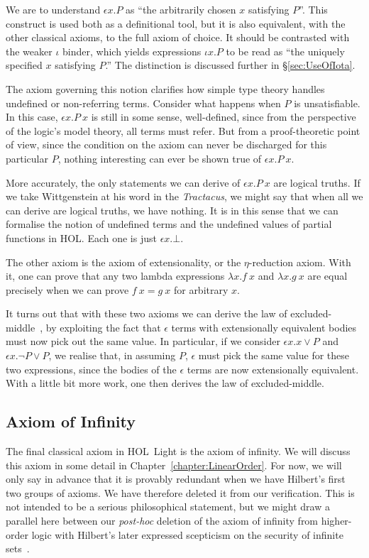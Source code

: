 We are to understand $\epsilon x. P$ as ``the arbitrarily chosen $x$ satisfying $P$''. This construct is used both as a definitional tool, but it is also equivalent, with the other classical axioms, to the full axiom of choice. It should be contrasted with the weaker $\iota$ binder, which yields expressions $\iota x. P$ to be read as ``the uniquely specified $x$ satisfying $P$.'' The distinction is discussed further in \S\ref{sec:UseOfIota}.

The axiom governing this notion clarifies how simple type theory handles undefined or non-referring terms. Consider what happens when $P$ is unsatisfiable. In this case, $\epsilon x. P\ x$ is still in some sense, well-defined, since from the perspective of the logic's model theory, all terms must refer. But from a proof-theoretic point of view, since the condition on the axiom can never be discharged for this particular $P$, nothing interesting can ever be shown true of $\epsilon x. P\ x$. 

More accurately, the only statements we can derive of $\epsilon x. P\ x$ are logical truths. If we take Wittgenstein at his word in the \emph{Tractacus}, we might say that when all we can derive are logical truths, we have nothing. It is in this sense that we can formalise the notion of undefined terms and the undefined values of partial functions in HOL. Each one is just $\epsilon x. \bot$.

The other axiom is the axiom of extensionality, or the $\eta$-reduction axiom. With it, one can prove that any two lambda expressions $\lambda x. f\ x$ and $\lambda x. g\ x$ are equal precisely when we can prove $f\ x = g\ x$ for arbitrary $x$.

It turns out that with these two axioms we can derive the law of excluded-middle~\cite{AxiomChoiceExcludedMiddle}, by exploiting the fact that $\epsilon$ terms with extensionally equivalent bodies must now pick out the same value. In particular, if we consider $\epsilon x. x \vee P$ and $\epsilon x. \neg P \vee P$, we realise that, in assuming $P$, $\epsilon$ must pick the same value for these two expressions, since the bodies of the $\epsilon$ terms are now extensionally equivalent. With a little bit more work, one then derives the law of excluded-middle.

\subsection{Axiom of Infinity}\label{sec:InfinityDescription}
The final classical axiom in HOL~Light is the axiom of infinity. We will discuss this axiom in some detail in Chapter~\ref{chapter:LinearOrder}. For now, we will only say in advance that it is provably redundant when we have Hilbert's first two groups of axioms. We have therefore deleted it from our verification. This is not intended to be a serious philosophical statement, but we might draw a parallel here between our \emph{post-hoc} deletion of the axiom of infinity from higher-order logic with Hilbert's later expressed scepticism on the security of infinite sets~\cite{OnInfinite}.

